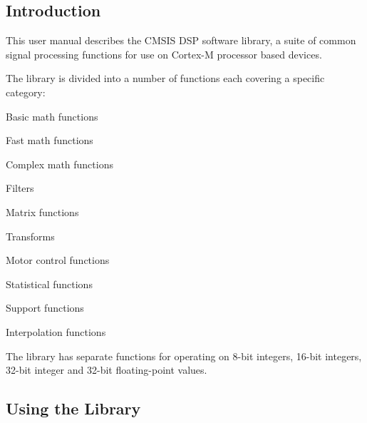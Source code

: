 \subsection*{Introduction }

This user manual describes the C\-M\-S\-I\-S D\-S\-P software library, a suite of common signal processing functions for use on Cortex-\/\-M processor based devices.

The library is divided into a number of functions each covering a specific category\-:
\begin{DoxyItemize}
\item Basic math functions
\item Fast math functions
\item Complex math functions
\item Filters
\item Matrix functions
\item Transforms
\item Motor control functions
\item Statistical functions
\item Support functions
\item Interpolation functions
\end{DoxyItemize}

The library has separate functions for operating on 8-\/bit integers, 16-\/bit integers, 32-\/bit integer and 32-\/bit floating-\/point values.

\subsection*{Using the Library }

